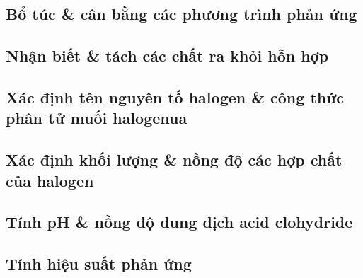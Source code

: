 \documentclass{article}
\numberwithin{equation}{section}
\begin{document}
\subsection{Bổ túc \& cân bằng các phương trình phản ứng}


\subsection{Nhận biết \& tách các chất ra khỏi hỗn hợp}


\subsection{Xác định tên nguyên tố halogen \& công thức phân tử muối halogenua}


\subsection{Xác định khối lượng \& nồng độ các hợp chất của halogen}


\subsection{Tính pH \& nồng độ dung dịch acid clohydride}


\subsection{Tính hiệu suất phản ứng}


\printbibliography[heading=bibintoc]
	
\end{document}
